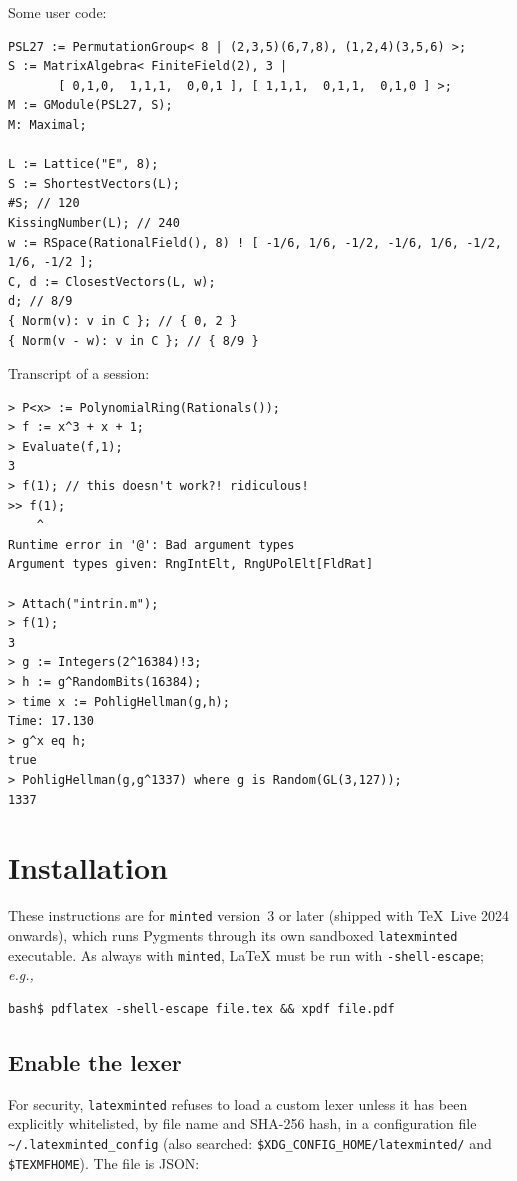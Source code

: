 \documentclass{article}
\begin{document}
Some user code:

\begin{verbatim}
PSL27 := PermutationGroup< 8 | (2,3,5)(6,7,8), (1,2,4)(3,5,6) >;
S := MatrixAlgebra< FiniteField(2), 3 |
       [ 0,1,0,  1,1,1,  0,0,1 ], [ 1,1,1,  0,1,1,  0,1,0 ] >;
M := GModule(PSL27, S);
M: Maximal;

L := Lattice("E", 8);
S := ShortestVectors(L);
#S; // 120
KissingNumber(L); // 240
w := RSpace(RationalField(), 8) ! [ -1/6, 1/6, -1/2, -1/6, 1/6, -1/2, 1/6, -1/2 ];
C, d := ClosestVectors(L, w);
d; // 8/9
{ Norm(v): v in C }; // { 0, 2 }
{ Norm(v - w): v in C }; // { 8/9 }
\end{verbatim}

Transcript of a session:

\begin{verbatim}
> P<x> := PolynomialRing(Rationals());
> f := x^3 + x + 1;
> Evaluate(f,1);
3
> f(1); // this doesn't work?! ridiculous!
>> f(1);
    ^
Runtime error in '@': Bad argument types
Argument types given: RngIntElt, RngUPolElt[FldRat]

> Attach("intrin.m");
> f(1);
3
> g := Integers(2^16384)!3;
> h := g^RandomBits(16384);
> time x := PohligHellman(g,h);
Time: 17.130
> g^x eq h;
true
> PohligHellman(g,g^1337) where g is Random(GL(3,127));
1337
\end{verbatim}


\section{Installation}

These instructions are for \texttt{minted} version~3 or later (shipped
with \TeX{}~Live 2024 onwards), which runs Pygments through its own
sandboxed \texttt{latexminted} executable. As always with
\texttt{minted}, \LaTeX{} must be run with \texttt{-shell-escape};
\textit{e.g.,}
%
\begin{verbatim}
bash$ pdflatex -shell-escape file.tex && xpdf file.pdf
\end{verbatim}


\subsection{Enable the lexer}

For security, \texttt{latexminted} refuses to load a custom lexer
unless it has been explicitly whitelisted, by file name and SHA-256
hash, in a configuration file \texttt{\textasciitilde/.latexminted\_config}
(also searched: \texttt{\$XDG\_CONFIG\_HOME/latexminted/} and
\texttt{\$TEXMFHOME}). The file is JSON:
\end{document}
